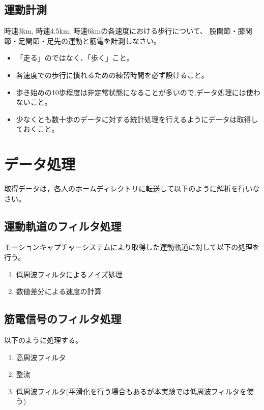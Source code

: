 \documentclass{jarticle}
\begin{document}
\subsection{運動計測}

時速3km, 時速4.5km, 時速6kmの各速度における歩行について、
股関節・膝関節・足関節・足先の運動と筋電を計測しなさい。
\begin{itemize}
\item 「走る」のではなく、「歩く」こと。
\item 各速度での歩行に慣れるための練習時間を必ず設けること。
\item 歩き始めの10歩程度は非定常状態になることが多いので,データ処理には使わないこと。
\item 少なくとも数十歩のデータに対する統計処理を行えるようにデータは取得しておくこと。
\end{itemize}

\section{データ処理}
取得データは，各人のホームディレクトリに転送して以下のように解析を行いなさい。

\subsection{運動軌道のフィルタ処理}
モーションキャプチャーシステムにより取得した運動軌道に対して以下の処理を行う。
\begin{enumerate}
  \item 低周波フィルタによるノイズ処理
  \item 数値差分による速度の計算
\end{enumerate}



\subsection{筋電信号のフィルタ処理}

以下のように処理する。
\begin{enumerate}
  \item 高周波フィルタ
  \item 整流
  \item 低周波フィルタ(平滑化を行う場合もあるが本実験では低周波フィルタを使う)
\end{enumerate}
\end{document}
